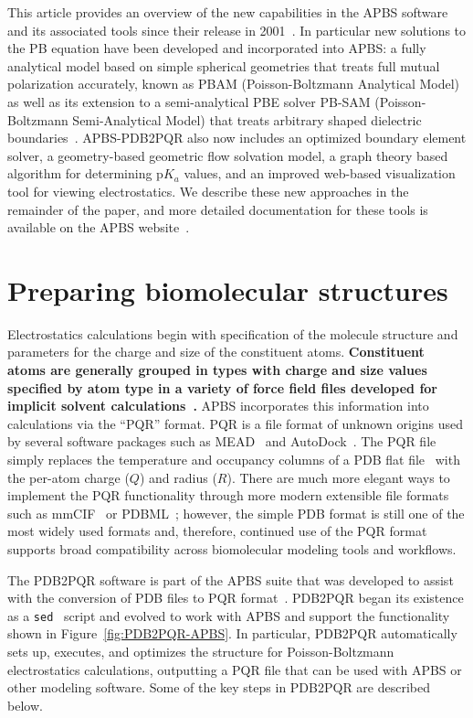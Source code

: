 \documentclass[12pt,titlepage]{article}
\newcommand{\revision}[1]{\color{red} \textbf{#1} \leavevmode\color{black}}
\begin{document}
This article provides an overview of the new capabilities in the APBS software and its associated tools since their release in 2001~\cite{Holst2000, Baker2000, Baker2001a, Baker2001}.
In particular new solutions to the PB equation have been developed and incorporated into APBS: a fully analytical model based on simple spherical geometries that treats full mutual polarization accurately, known as PBAM (Poisson-Boltzmann Analytical Model)~\cite{Lotan2006, Felberg2017} as well as its extension to a semi-analytical PBE solver PB-SAM (Poisson-Boltzmann Semi-Analytical Model) that treats arbitrary shaped dielectric boundaries~\cite{Yap2010, Yap2013}.
APBS-PDB2PQR also now includes an optimized boundary element solver, a geometry-based geometric flow solvation model, a graph theory based algorithm for determining p$K_a$ values, and an improved web-based visualization tool for viewing electrostatics.
We describe these new approaches in the remainder of the paper, and more detailed documentation for these tools is available on the APBS website~\cite{APBSweb}.

\section{Preparing biomolecular structures} \label{sec:prep}
Electrostatics calculations begin with specification of the molecule structure and parameters for the charge and size of the constituent atoms.
\revision{Constituent atoms are generally grouped in types with charge and size values specified by atom type in a variety of force field files developed for implicit solvent calculations~\cite{Ren2012}.}
APBS incorporates this information into calculations via the ``PQR'' format. PQR is a file format of unknown origins used by several software packages such as MEAD~\cite{Bashford1997} and AutoDock~\cite{Morris2009}.
The PQR file simply replaces the temperature and occupancy columns of a PDB flat file~\cite{PDBflat} with the per-atom charge ($Q$) and radius ($R$).
There are much more elegant ways to implement the PQR functionality through more modern extensible file formats such as mmCIF~\cite{mmCIF} or PDBML~\cite{PDBML}; however, the simple PDB format is still one of the most widely used formats and, therefore, continued use of the PQR format supports broad compatibility across biomolecular modeling tools and workflows.

The PDB2PQR software is part of the APBS suite that was developed to assist with the conversion of PDB files to PQR format~\cite{Dolinsky2004, Dolinsky2007}.
PDB2PQR began its existence as a \texttt{sed}~\cite{sed} script and evolved to work with APBS and support the functionality shown in Figure~\ref{fig:PDB2PQR-APBS}.
In particular, PDB2PQR automatically sets up, executes, and optimizes the structure for Poisson-Boltzmann electrostatics calculations, outputting a PQR file that can be used with APBS or other modeling software.
Some of the key steps in PDB2PQR are described below.
\end{document}
